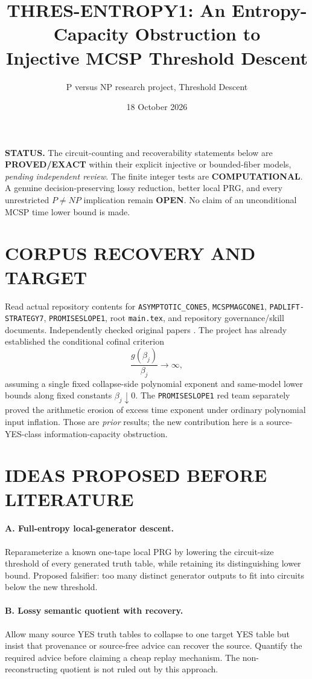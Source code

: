 \documentclass[11pt]{article}
\title{THRES-ENTROPY1: An Entropy-Capacity Obstruction to\\
Injective MCSP Threshold Descent}
\author{P versus NP research project, Threshold Descent}
\date{18 October 2026}
\begin{document}
\maketitle

\noindent\textbf{STATUS.}
The circuit-counting and recoverability statements below are \textbf{PROVED/EXACT}
within their explicit injective or bounded-fiber models, \emph{pending
independent review}.  The finite integer tests are \textbf{COMPUTATIONAL}.
A genuine decision-preserving lossy reduction, better local PRG,
and every unrestricted \(P\ne NP\) implication remain \textbf{OPEN}.
No claim of an unconditional MCSP time lower bound is made.

\section{CORPUS RECOVERY AND TARGET}
Read actual repository contents for
\texttt{ASYMPTOTIC\_CONE5},
\texttt{MCSPMAGCONE1},
\texttt{PADLIFT-STRATEGY7},
\texttt{PROMISESLOPE1}, root \texttt{main.tex}, and repository
governance/skill documents.  Independently checked original papers
\cite{MMW2019,CHMY2020,OPS2018,GJK2026}.
The project has already established the conditional cofinal criterion
\[
  \frac{g(\beta_j)}{\beta_j}\longrightarrow\infty,
\]
assuming a single fixed collapse-side polynomial exponent and
same-model lower bounds along fixed constants \(\beta_j\downarrow0\).
The \texttt{PROMISESLOPE1} red team separately proved the arithmetic
erosion of excess time exponent under ordinary polynomial input inflation.
Those are \emph{prior} results; the new contribution here is a
source-YES-class information-capacity obstruction.

\section{IDEAS PROPOSED BEFORE LITERATURE}
\paragraph{A. Full-entropy local-generator descent.}
Reparameterize a known one-tape local PRG by lowering the circuit-size
threshold of every generated truth table, while retaining its
distinguishing lower bound.  Proposed falsifier: too many distinct
generator outputs to fit into circuits below the new threshold.

\paragraph{B. Lossy semantic quotient with recovery.}
Allow many source YES truth tables to collapse to one target YES table
but insist that provenance or source-free advice can recover the source.
Quantify the required advice before claiming a cheap replay mechanism.
The non-reconstructing quotient is not ruled out by this approach.
\end{document}
